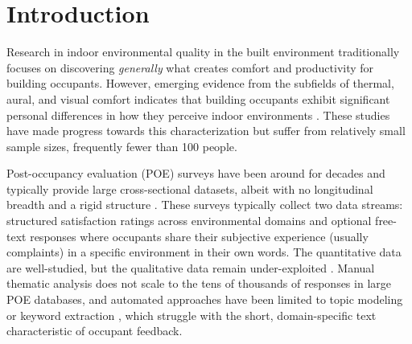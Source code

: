 \documentclass[sigconf]{acmart}
\begin{document}

\maketitle

\section{Introduction}
\label{sec:intro}

Research in indoor environmental quality in the built environment traditionally focuses on discovering \emph{generally} what creates comfort and productivity for building occupants. However, emerging evidence from the subfields of thermal, aural, and visual comfort indicates that building occupants exhibit significant personal differences in how they perceive indoor environments \cite{Kim2018-tu,Quintana2023-ik}. These studies have made progress towards this characterization but suffer from relatively small sample sizes, frequently fewer than 100 people. 

Post-occupancy evaluation (POE) surveys have been around for decades and typically provide large cross-sectional datasets, albeit with no longitudinal breadth and a rigid structure \cite{graham2021}. These surveys typically collect two data streams: structured satisfaction ratings across environmental domains and optional free-text responses where occupants share their subjective experience (usually complaints) in a specific environment in their own words. The quantitative data are well-studied, but the qualitative data remain under-exploited \cite{graham2021}. Manual thematic analysis does not scale to the tens of thousands of responses in large POE databases, and automated approaches have been limited to topic modeling or keyword extraction \cite{Moezzi01042011}, which struggle with the short, domain-specific text characteristic of occupant feedback.
\end{document}
